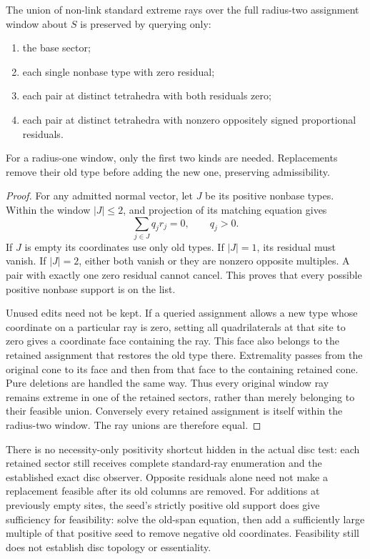 \begin{proposition}
The union of non-link standard extreme rays over the full radius-two
assignment window about $S$ is preserved by querying only:
\begin{enumerate}
\item the base sector;
\item each single nonbase type with zero residual;
\item each pair at distinct tetrahedra with both residuals zero;
\item each pair at distinct tetrahedra with nonzero oppositely signed
      proportional residuals.
\end{enumerate}
For a radius-one window, only the first two kinds are needed. Replacements
remove their old type before adding the new one, preserving admissibility.
\end{proposition}
\begin{proof}
For any admitted normal vector, let $J$ be its positive nonbase types.
Within the window $|J|\le2$, and projection of its matching equation gives
\[
                  \sum_{j\in J}q_jr_j=0,\qquad q_j>0.
\]
If $J$ is empty its coordinates use only old types. If $|J|=1$, its
residual must vanish. If $|J|=2$, either both vanish or they are nonzero
opposite multiples. A pair with exactly one zero residual cannot cancel.
This proves that every possible positive nonbase support is on the list.

Unused edits need not be kept. If a queried assignment allows a new type
whose coordinate on a particular ray is zero, setting all quadrilaterals
at that site to zero gives a coordinate face containing the ray. This
face also belongs to the retained assignment that restores the old type
there. Extremality passes from the original cone to its face and then
from that face to the containing retained cone. Pure deletions are handled
the same way. Thus every original window ray remains extreme in one of the
retained sectors, rather than merely belonging to their feasible union.
Conversely every retained assignment is itself within the radius-two
window. The ray unions are therefore equal.
\end{proof}

There is no necessity-only positivity shortcut hidden in the actual
disc test: each retained sector still receives complete standard-ray
enumeration and the established exact disc observer. Opposite residuals
alone need not make a replacement feasible after its old columns are
removed. For additions at previously empty sites, the seed's strictly
positive old support does give sufficiency for feasibility: solve the
old-span equation, then add a sufficiently large multiple of that positive
seed to remove negative old coordinates. Feasibility still does not
establish disc topology or essentiality.

